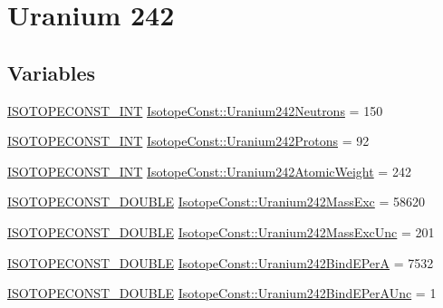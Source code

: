 \hypertarget{group___isotope_const-_uranium-_u242}{}\section{Uranium 242}
\label{group___isotope_const-_uranium-_u242}
\subsection*{Variables}
\begin{DoxyCompactItemize}
\item 
\mbox{\hyperlink{group___isotope_const-_macros_ga5f18360b3e99483a35c32d789e62621c}{I\+S\+O\+T\+O\+P\+E\+C\+O\+N\+S\+T\+\_\+\+I\+NT}} \mbox{\hyperlink{group___isotope_const-_uranium-_u242_ga267fe317fdf08416052a7675d0df6bab}{Isotope\+Const\+::\+Uranium242\+Neutrons}} = 150
\item 
\mbox{\hyperlink{group___isotope_const-_macros_ga5f18360b3e99483a35c32d789e62621c}{I\+S\+O\+T\+O\+P\+E\+C\+O\+N\+S\+T\+\_\+\+I\+NT}} \mbox{\hyperlink{group___isotope_const-_uranium-_u242_ga0091931ad668f2015e63b5a8aaa03d3b}{Isotope\+Const\+::\+Uranium242\+Protons}} = 92
\item 
\mbox{\hyperlink{group___isotope_const-_macros_ga5f18360b3e99483a35c32d789e62621c}{I\+S\+O\+T\+O\+P\+E\+C\+O\+N\+S\+T\+\_\+\+I\+NT}} \mbox{\hyperlink{group___isotope_const-_uranium-_u242_gaac49e837f4870c35339ad3b8b9017707}{Isotope\+Const\+::\+Uranium242\+Atomic\+Weight}} = 242
\item 
\mbox{\hyperlink{group___isotope_const-_macros_ga8f45a7272ce02c0b4c65c44636ed719a}{I\+S\+O\+T\+O\+P\+E\+C\+O\+N\+S\+T\+\_\+\+D\+O\+U\+B\+LE}} \mbox{\hyperlink{group___isotope_const-_uranium-_u242_gaa9eed680e4dca8a22c1aaeb92b0e1f2c}{Isotope\+Const\+::\+Uranium242\+Mass\+Exc}} = 58620
\item 
\mbox{\hyperlink{group___isotope_const-_macros_ga8f45a7272ce02c0b4c65c44636ed719a}{I\+S\+O\+T\+O\+P\+E\+C\+O\+N\+S\+T\+\_\+\+D\+O\+U\+B\+LE}} \mbox{\hyperlink{group___isotope_const-_uranium-_u242_ga1ac9dc1cf3557102c5692028dc21f6a7}{Isotope\+Const\+::\+Uranium242\+Mass\+Exc\+Unc}} = 201
\item 
\mbox{\hyperlink{group___isotope_const-_macros_ga8f45a7272ce02c0b4c65c44636ed719a}{I\+S\+O\+T\+O\+P\+E\+C\+O\+N\+S\+T\+\_\+\+D\+O\+U\+B\+LE}} \mbox{\hyperlink{group___isotope_const-_uranium-_u242_gad6afa02a78aa3206a3905001d90c1639}{Isotope\+Const\+::\+Uranium242\+Bind\+E\+PerA}} = 7532
\item 
\mbox{\hyperlink{group___isotope_const-_macros_ga8f45a7272ce02c0b4c65c44636ed719a}{I\+S\+O\+T\+O\+P\+E\+C\+O\+N\+S\+T\+\_\+\+D\+O\+U\+B\+LE}} \mbox{\hyperlink{group___isotope_const-_uranium-_u242_ga0160187a0c390c4f40799d188eb45e60}{Isotope\+Const\+::\+Uranium242\+Bind\+E\+Per\+A\+Unc}} = 1

\end{DoxyCompactItemize}
